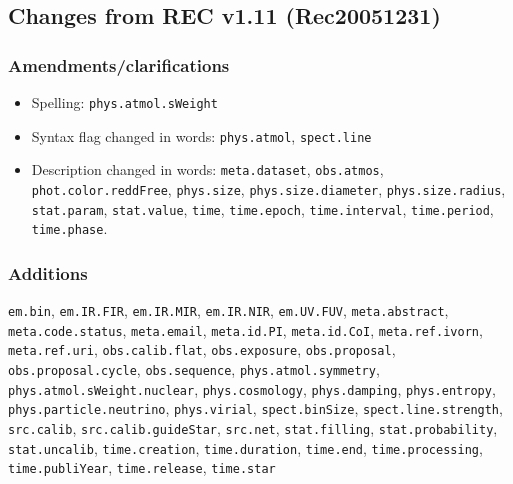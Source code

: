 \documentclass[11pt,a4paper]{ivoa}
\begin{document}
\subsection{Changes from REC v1.11 (Rec20051231)}
\subsubsection*{Amendments/clarifications}
\begin{itemize}
\item Spelling: {\tt phys.atmol.sWeight}
\item Syntax flag changed in words: {\tt phys.atmol}, {\tt spect.line}
\item \begin{flushleft}
Description changed in words: 
{\tt meta.dataset}, {\tt obs.atmos}, {\tt phot.color.reddFree}, 
{\tt phys.size}, {\tt phys.size.diameter}, {\tt phys.size.radius}, {\tt stat.param}, {\tt stat.value}, 
{\tt time}, {\tt time.epoch}, {\tt time.interval}, {\tt time.period}, {\tt time.phase}.
\end{flushleft}
\end{itemize}

\subsubsection*{Additions}
\begin{flushleft}
{\tt em.bin}, {\tt em.IR.FIR}, {\tt em.IR.MIR}, {\tt em.IR.NIR}, {\tt em.UV.FUV}, 
{\tt meta.abstract}, {\tt meta.code.status}, {\tt meta.email}, {\tt meta.id.PI}, {\tt meta.id.CoI}, 
{\tt meta.ref.ivorn}, {\tt meta.ref.uri}, {\tt obs.calib.flat}, {\tt obs.exposure}, {\tt obs.proposal}, 
{\tt obs.proposal.cycle}, {\tt obs.sequence}, {\tt phys.atmol.symmetry}, {\tt phys.atmol.sWeight.nuclear}, 
{\tt phys.cosmology}, {\tt phys.damping}, {\tt phys.entropy}, {\tt phys.particle.neutrino}, {\tt phys.virial}, {\tt spect.binSize},
{\tt spect.line.strength}, {\tt src.calib}, {\tt src.calib.guideStar}, {\tt src.net}, {\tt stat.filling}, 
{\tt stat.probability}, {\tt stat.uncalib}, {\tt time.creation}, {\tt time.duration}, {\tt time.end}, 
{\tt time.processing}, {\tt time.publiYear}, {\tt time.release}, {\tt time.star}
\end{flushleft}
\end{document}
